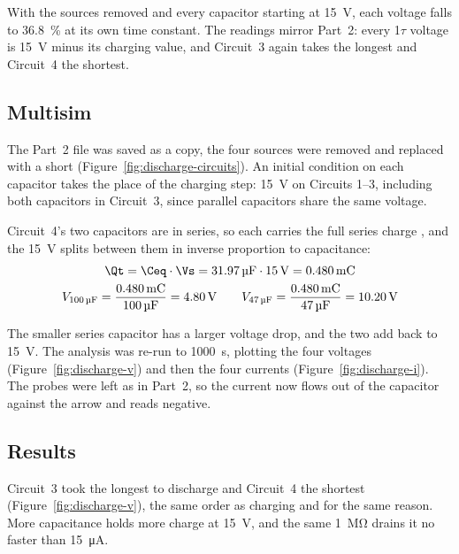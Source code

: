 \documentclass[offwhitecover]{lennylab}
\newcommand{\ntau}[1]{#1\(\tau\)}   %
\begin{document}
With the sources removed and every capacitor starting at \qty{15}{\volt}, each voltage falls to \qty{36.8}{\percent} at its own time constant. The readings mirror Part~2: every \ntau{1} voltage is \qty{15}{\volt} minus its charging value, and Circuit~3 again takes the longest and Circuit~4 the shortest.

\subsection{Multisim}

The Part~2 file was saved as a copy, the four sources were removed and replaced with a short (Figure~\ref{fig:discharge-circuits}). An initial condition on each capacitor takes the place of the charging step: \qty{15}{\volt} on Circuits 1--3, including both capacitors in Circuit~3, since parallel capacitors share the same voltage.

Circuit~4's two capacitors are in series, so each carries the full series charge \Qt{}, and the \qty{15}{\volt} splits between them in inverse proportion to capacitance:
\begin{gather}
  \Qt = \Ceq \cdot \Vs = \qty{31.97}{\micro\farad} \cdot \qty{15}{\volt} =\qty{0.480}{\milli\coulomb} \\
  V_{\qty{100}{\micro\farad}} = \frac{\qty{0.480}{\milli\coulomb}}{\qty{100}{\micro\farad}} = \qty{4.80}{\volt}
  \qquad
  V_{\qty{47}{\micro\farad}} = \frac{\qty{0.480}{\milli\coulomb}}{\qty{47}{\micro\farad}} = \qty{10.20}{\volt}
\end{gather}

The smaller series capacitor has a larger voltage drop, and the two add back to \qty{15}{\volt}. The analysis was re-run to \qty{1000}{\second}, plotting the four voltages (Figure~\ref{fig:discharge-v}) and then the four currents (Figure~\ref{fig:discharge-i}). The probes were left as in Part~2, so the current now flows out of the capacitor against the arrow and reads negative.

\subsection{Results}

Circuit~3 took the longest to discharge and Circuit~4 the shortest (Figure~\ref{fig:discharge-v}), the same order as charging and for the same reason. More capacitance holds more charge at \qty{15}{\volt}, and the same \qty{1}{\mega\ohm} drains it no faster than \qty{15}{\micro\ampere}.
\end{document}
